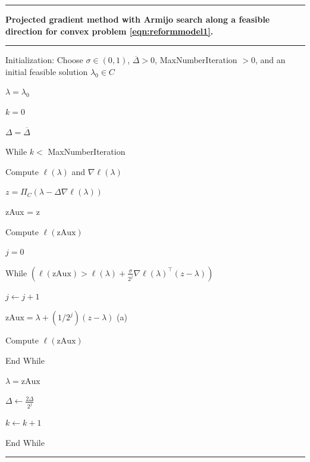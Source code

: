 \documentclass[article]{jss}
\begin{document}
\hrule
\vspace*{0.2cm}
\par {\textbf{Projected gradient method with Armijo search along a feasible direction for convex problem \eqref{eqn:reformmodel1}.}}
\vspace*{0.2cm}
\hrule
\vspace*{0.2cm}
\par Initialization: Choose $\sigma \in (0,1)$, $\overline{\Delta} > 0$, MaxNumberIteration $> 0$, and an initial feasible solution $\lambda_{0} \in C$
\par $\lambda = \lambda_{0}$
\par $k = 0$ %
\par $\Delta = \overline{\Delta}$
\par While $k <$ MaxNumberIteration
\par \hspace*{1cm} Compute $\ell(\lambda)$ and $\nabla \ell(\lambda)$
\par \hspace*{1cm} $z = \Pi_{C}(\lambda - \Delta \nabla \ell(\lambda))$
\par \hspace*{1cm} \mbox{zAux} = z
\par \hspace*{1cm} Compute $\ell(\mbox{zAux})$
\par \hspace*{1cm} $j = 0$
\par \hspace*{1cm} While $\left(\displaystyle{\ell(\mbox{zAux}) > \ell(\lambda) + \frac{\sigma}{2^{j}} \nabla \ell(\lambda)^{\top} (z - \lambda)}\right)$
\par \hspace*{2cm} $j \leftarrow j + 1$
\par \hspace*{2cm} $\mbox{zAux} = \lambda + (1/2^{j}) (z - \lambda)$ \hspace*{2cm}(a)
\par \hspace*{2cm} Compute $\ell(\mbox{zAux})$
\par \hspace*{1cm} End While
\par \hspace*{1cm} $\lambda = \mbox{zAux}$
\par \hspace*{1cm} $\displaystyle{\Delta \leftarrow \frac{2 \Delta}{2^{j}}}$
\par \hspace*{1cm} $k \leftarrow k+1$
\par End While
\vspace*{0.2cm}
\hrule
\vspace*{0.5cm}
\end{document}
